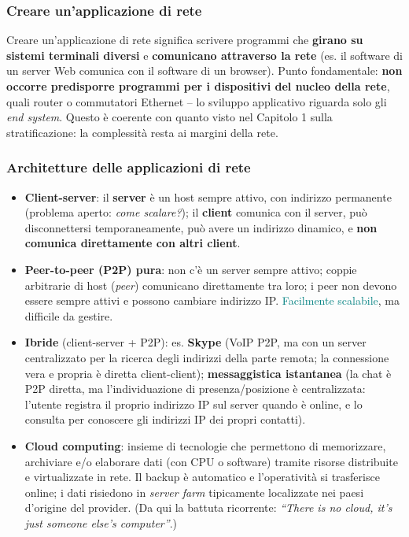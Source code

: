 \documentclass[12pt, a4paper]{article}
\begin{document}
\subsubsection{Creare un'applicazione di rete}

Creare un'applicazione di rete significa scrivere programmi che \textbf{girano su sistemi terminali diversi} e \textbf{comunicano attraverso la rete} (es. il software di un server Web comunica con il software di un browser). Punto fondamentale: \textbf{non occorre predisporre programmi per i dispositivi del nucleo della rete}, quali router o commutatori Ethernet -- lo sviluppo applicativo riguarda solo gli \textit{end system}. Questo è coerente con quanto visto nel Capitolo 1 sulla stratificazione: la complessità resta ai margini della rete.

\subsubsection{Architetture delle applicazioni di rete}

\begin{itemize}
    \item \textbf{Client-server}: il \textbf{server} è un host sempre attivo, con indirizzo permanente (problema aperto: \textit{come scalare?}); il \textbf{client} comunica con il server, può disconnettersi temporaneamente, può avere un indirizzo dinamico, e \textbf{non comunica direttamente con altri client}.
    \item \textbf{Peer-to-peer (P2P) pura}: non c'è un server sempre attivo; coppie arbitrarie di host (\textit{peer}) comunicano direttamente tra loro; i peer non devono essere sempre attivi e possono cambiare indirizzo IP. \textcolor{teal}{Facilmente scalabile}, ma \textcolor{red!70!black}{difficile da gestire}.
    \item \textbf{Ibride} (client-server + P2P): es. \textbf{Skype} (VoIP P2P, ma con un server centralizzato per la ricerca degli indirizzi della parte remota; la connessione vera e propria è diretta client-client); \textbf{messaggistica istantanea} (la chat è P2P diretta, ma l'individuazione di presenza/posizione è centralizzata: l'utente registra il proprio indirizzo IP sul server quando è online, e lo consulta per conoscere gli indirizzi IP dei propri contatti).
    \item \textbf{Cloud computing}: insieme di tecnologie che permettono di memorizzare, archiviare e/o elaborare dati (con CPU o software) tramite risorse distribuite e virtualizzate in rete. Il backup è automatico e l'operatività si trasferisce online; i dati risiedono in \textit{server farm} tipicamente localizzate nei paesi d'origine del provider. (Da qui la battuta ricorrente: \textit{``There is no cloud, it's just someone else's computer''}.)
\end{itemize}
\end{document}
